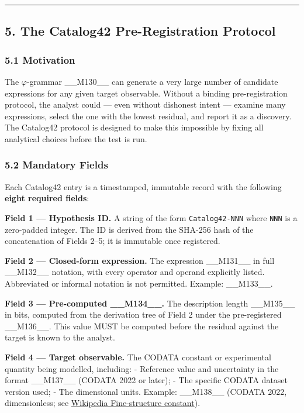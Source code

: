 \noindent\rule{\textwidth}{0.4pt}

\subsection{5. The Catalog42 Pre-Registration Protocol}

\subsubsection{5.1 Motivation}

The $\varphi$-grammar \_\_M130\_\_ can generate a very large number of candidate expressions for any given target observable. Without a binding pre-registration protocol, the analyst could --- even without dishonest intent --- examine many expressions, select the one with the lowest residual, and report it as a discovery. The Catalog42 protocol is designed to make this impossible by fixing all analytical choices before the test is run.

\subsubsection{5.2 Mandatory Fields}

Each Catalog42 entry is a timestamped, immutable record with the following \textbf{eight required fields}:

\textbf{Field 1 --- Hypothesis ID.} A string of the form \texttt{Catalog42-NNN} where \texttt{NNN} is a zero-padded integer. The ID is derived from the SHA-256 hash of the concatenation of Fields 2--5; it is immutable once registered.

\textbf{Field 2 --- Closed-form expression.} The expression \_\_M131\_\_ in full \_\_M132\_\_ notation, with every operator and operand explicitly listed. Abbreviated or informal notation is not permitted. Example: \_\_M133\_\_.

\textbf{Field 3 --- Pre-computed \_\_M134\_\_.} The description length \_\_M135\_\_ in bits, computed from the derivation tree of Field 2 under the pre-registered \_\_M136\_\_. This value MUST be computed before the residual against the target is known to the analyst.

\textbf{Field 4 --- Target observable.} The CODATA constant or experimental quantity being modelled, including:
- Reference value and uncertainty in the format \_\_M137\_\_ (CODATA 2022 or later);
- The specific CODATA dataset version used;
- The dimensional units.
Example: \_\_M138\_\_ (CODATA 2022, dimensionless; see \href{https://en.wikipedia.org/wiki/Fine-structure\_constant}{Wikipedia Fine-structure constant}).

